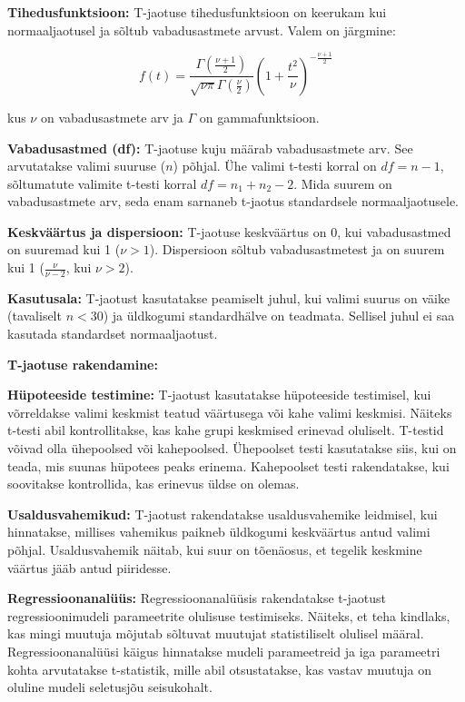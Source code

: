 \documentclass[
]{book}
\begin{document}
\textbf{Tihedusfunktsioon:} T-jaotuse tihedusfunktsioon on keerukam kui normaaljaotusel ja sõltub vabadusastmete arvust. Valem on järgmine:

\[f(t) = \frac{\Gamma\left(\frac{\nu + 1}{2}\right)}{\sqrt{\nu\pi}\Gamma\left(\frac{\nu}{2}\right)} \left(1 + \frac{t^2}{\nu}\right)^{-\frac{\nu + 1}{2}}\]

kus \(\nu\) on vabadusastmete arv ja \(\Gamma\) on gammafunktsioon.

\textbf{Vabadusastmed (df):} T-jaotuse kuju määrab vabadusastmete arv. See arvutatakse valimi suuruse (\(n\)) põhjal. Ühe valimi t-testi korral on \(df = n - 1\), sõltumatute valimite t-testi korral \(df = n_1 + n_2 - 2\). Mida suurem on vabadusastmete arv, seda enam sarnaneb t-jaotus standardsele normaaljaotusele.

\textbf{Keskväärtus ja dispersioon:} T-jaotuse keskväärtus on 0, kui vabadusastmed on suuremad kui 1 (\(\nu > 1\)). Dispersioon sõltub vabadusastmetest ja on suurem kui 1 (\(\frac{\nu}{\nu-2}\), kui \(\nu>2\)).

\textbf{Kasutusala:} T-jaotust kasutatakse peamiselt juhul, kui valimi suurus on väike (tavaliselt \(n < 30\)) ja üldkogumi standardhälve on teadmata. Sellisel juhul ei saa kasutada standardset normaaljaotust.

\textbf{T-jaotuse rakendamine:}

\textbf{Hüpoteeside testimine:} T-jaotust kasutatakse hüpoteeside testimisel, kui võrreldakse valimi keskmist teatud väärtusega või kahe valimi keskmisi. Näiteks t-testi abil kontrollitakse, kas kahe grupi keskmised erinevad oluliselt. T-testid võivad olla ühepoolsed või kahepoolsed. Ühepoolset testi kasutatakse siis, kui on teada, mis suunas hüpotees peaks erinema. Kahepoolset testi rakendatakse, kui soovitakse kontrollida, kas erinevus üldse on olemas.

\textbf{Usaldusvahemikud:} T-jaotust rakendatakse usaldusvahemike leidmisel, kui hinnatakse, millises vahemikus paikneb üldkogumi keskväärtus antud valimi põhjal. Usaldusvahemik näitab, kui suur on tõenäosus, et tegelik keskmine väärtus jääb antud piiridesse.

\textbf{Regressioonanalüüs:} Regressioonanalüüsis rakendatakse t-jaotust regressioonimudeli parameetrite olulisuse testimiseks. Näiteks, et teha kindlaks, kas mingi muutuja mõjutab sõltuvat muutujat statistiliselt olulisel määral. Regressioonanalüüsi käigus hinnatakse mudeli parameetreid ja iga parameetri kohta arvutatakse t-statistik, mille abil otsustatakse, kas vastav muutuja on oluline mudeli seletusjõu seisukohalt.
\end{document}
